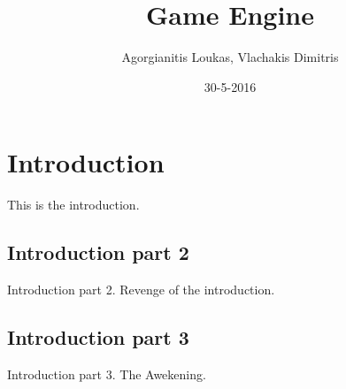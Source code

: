 \documentclass{article}
\title{Game Engine}
\date{30-5-2016}
\author{Agorgianitis Loukas, Vlachakis Dimitris}
\begin{document}
	\maketitle
	\newpage
	\tableofcontents
	\newpage

	\section{Introduction}
	This is the introduction.

	\subsection{Introduction part 2}
	Introduction part 2. Revenge of the introduction.

	\subsection{Introduction part 3}
	Introduction part 3. The Awekening.
\end{document}
